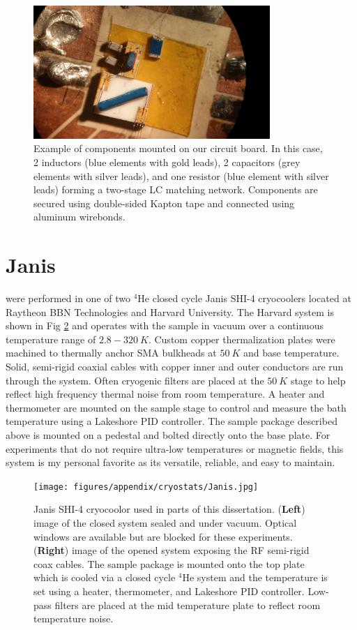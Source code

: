 \begin{figure}
\centering
\includegraphics[width = 0.8\textwidth]{figures/appendix/cryostats/sample_LC.jpg}
\caption{Example of components mounted on our circuit board. In this case, 2 inductors (blue elements with gold leads), 2 capacitors (grey elements with silver leads), and one resistor (blue element with silver leads) forming a two-stage LC matching network. Components are secured using double-sided Kapton tape and connected using aluminum wirebonds.}
\label{Fig:Appen:sample_LC}
\end{figure}


\section{Janis}

 were performed in one of two $^4$He closed cycle Janis SHI-4 cryocoolers located at Raytheon BBN Technologies and Harvard University. The Harvard system is shown in Fig \ref{Fig:Appen:Janis} and operates with the sample in vacuum over a continuous temperature range of $2.8-320~K$. Custom copper thermalization plates were machined to thermally anchor SMA bulkheads at $50~K$ and base temperature. Solid, semi-rigid coaxial cables with copper inner and outer conductors are run through the system. Often cryogenic filters are placed at the $50~K$ stage to help reflect high frequency thermal noise from room temperature. A heater and thermometer are mounted on the sample stage to control and measure the bath temperature using a Lakeshore PID controller. The sample package described above is mounted on a pedestal and bolted directly onto the base plate. For experiments that do not require ultra-low temperatures or magnetic fields, this system is my personal favorite as its versatile, reliable, and easy to maintain.
\begin{figure}
\centering
\texttt{[image: figures/appendix/cryostats/Janis.jpg]}
\caption{Janis SHI-4 cryocoolor used in parts of this dissertation. (\textbf{Left}) image of the closed system sealed and under vacuum. Optical windows are available but are blocked for these experiments. (\textbf{Right}) image of the opened system exposing the RF semi-rigid coax cables. The sample package is mounted onto the top plate which is cooled via a closed cycle $^4$He system and the temperature is set using a heater, thermometer, and Lakeshore PID controller. Low-pass filters are placed at the mid temperature plate to reflect room temperature noise.}
\label{Fig:Appen:Janis}
\end{figure}

